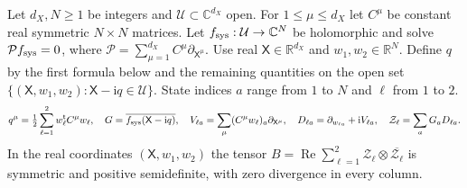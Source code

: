 Let $d_X,N\ge1$ be integers and $\mathcal U\subset\mathbb C^{d_X}$ open. For $1\le\mu\le d_X$ let $C^\mu$ be constant real symmetric $N\times N$ matrices. Let $f_{\rm sys}:\mathcal U\to\mathbb C^N$ be holomorphic and solve $\mathcal P f_{\rm sys}=0$, where $\mathcal P=\sum_{\mu=1}^{d_X} C^\mu\partial_{\mathsf X^\mu}$. Use real $\mathsf X\in\mathbb R^{d_X}$ and $w_1,w_2\in\mathbb R^N$. Define $q$ by the first formula below and the remaining quantities on the open set $\{(\mathsf X,w_1,w_2):\mathsf X-\mathrm i q\in\mathcal U\}$. State indices $a$ range from $1$ to $N$ and $\ell$ from $1$ to $2$.
\[
q^\mu=\tfrac12\sum_{\ell=1}^2w_\ell^{\mathsf t}C^\mu w_\ell,\quad
G=\overline{f_{\rm sys}(\mathsf X-\mathrm i q)},\quad
V_{\ell a}=\sum_\mu(C^\mu w_\ell)_a\partial_{\mathsf X^\mu},\quad
D_{\ell a}=\partial_{w_{\ell a}}+\mathrm iV_{\ell a},\quad
\mathcal Z_\ell=\sum_aG_aD_{\ell a}.
\]
In the real coordinates $(\mathsf X,w_1,w_2)$ the tensor $B=\operatorname{Re}\sum_{\ell=1}^2\mathcal Z_\ell\otimes\overline{\mathcal Z_\ell}$ is symmetric and positive semidefinite, with zero divergence in every column.
